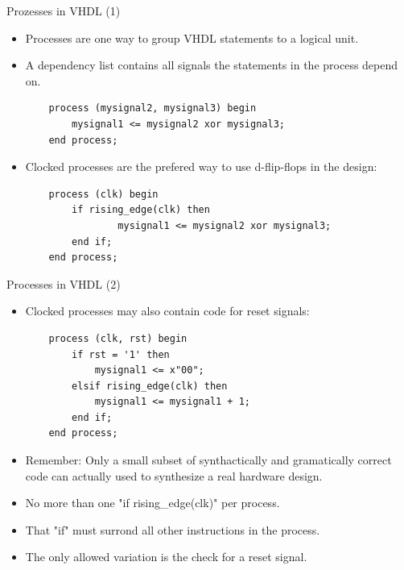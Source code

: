 \documentclass[pdf]{prosper}
\begin{document}
\begin{slide}{Prozesses in VHDL (1)}
\begin{itemize}

\item Processes are one way to group VHDL statements to a logical unit.
\vspace*{.3cm}
\item A dependency list contains all signals the statements in the process depend on.
\vspace*{.5cm}

\begin{verbatim}
    process (mysignal2, mysignal3) begin
        mysignal1 <= mysignal2 xor mysignal3;
    end process;
\end{verbatim}

\vspace*{.5cm}
\item Clocked processes are the prefered way to use d-flip-flops in the design:

\begin{verbatim}
    process (clk) begin
        if rising_edge(clk) then
                mysignal1 <= mysignal2 xor mysignal3;
        end if;
    end process;
\end{verbatim}

\end{itemize}

\end{slide}

\begin{slide}{Processes in VHDL (2)}
\begin{itemize}
\item Clocked processes may also contain code for reset signals:

\begin{verbatim}
    process (clk, rst) begin
        if rst = '1' then
            mysignal1 <= x"00";
        elsif rising_edge(clk) then
            mysignal1 <= mysignal1 + 1;
        end if;
    end process;
\end{verbatim}

\vspace*{.5cm}
\item Remember: Only a small subset of synthactically and gramatically correct code can actually used to synthesize a real hardware design.
\item No more than one "if rising\_edge(clk)" per process.
\item That "if" must surrond all other instructions in the process.
\item The only allowed variation is the check for a reset signal.

\end{itemize}
\end{slide}
\end{document}
